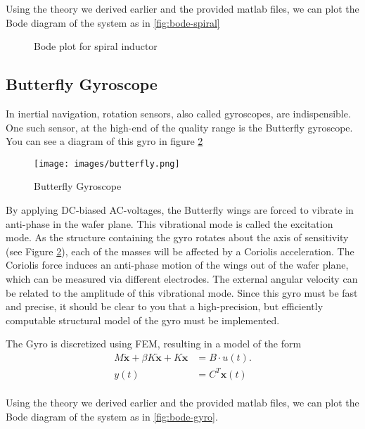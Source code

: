 \documentclass{article}
\newlength\figurewidth
\begin{document}
	Using the theory we derived earlier and the provided matlab files, we can plot the Bode diagram of the system as in \autoref{fig:bode-spiral}
		\begin{figure} [h!]
		\centering
		\setlength{\figurewidth}{2\textwidth}
		
		\caption{Bode plot for spiral inductor}\label{fig:bode-spiral}
	\end{figure}
	\subsection{Butterfly Gyroscope}
	In inertial navigation, rotation sensors, also called gyroscopes, are indispensible. One such sensor, at the high-end of the quality range is the Butterfly gyroscope. You can see a diagram of this gyro in figure \ref{fig:butterFly2}
	\begin{figure}[h]
		\center
		\texttt{[image: images/butterfly.png]}
		\caption{Butterfly Gyroscope}\label{fig:butterFly2}
	\end{figure}
	By applying DC-biased AC-voltages, the Butterfly wings are forced to vibrate in anti-phase in the wafer plane. This vibrational mode is called the excitation mode. As the structure containing the gyro rotates about the axis of sensitivity (see Figure \ref{fig:butterFly2}), each of the masses will be affected by a Coriolis acceleration. The Coriolis force induces an anti-phase motion of the wings out of the wafer plane, which can be measured via different electrodes. The external angular velocity can be related to the amplitude of this vibrational mode. Since this gyro must be fast and precise, it should be clear to you that a high-precision, but efficiently computable structural model of the gyro must be implemented.
	
	The Gyro is discretized using FEM, resulting in a model of the form
	\begin{equation}\label{eq:gyromodel}
		\begin{aligned}
			M\ddot{\mathbf{x}}+\beta K\dot{\mathbf{x}}+K\mathbf{x}&=B \cdot u(t).\\
			y(t)&=C^T \mathbf{x}(t)
		\end{aligned}
	\end{equation}\\
	Using the theory we derived earlier and the provided matlab files, we can plot the Bode diagram of the system as in \autoref{fig:bode-gyro}.
	
\end{document}
